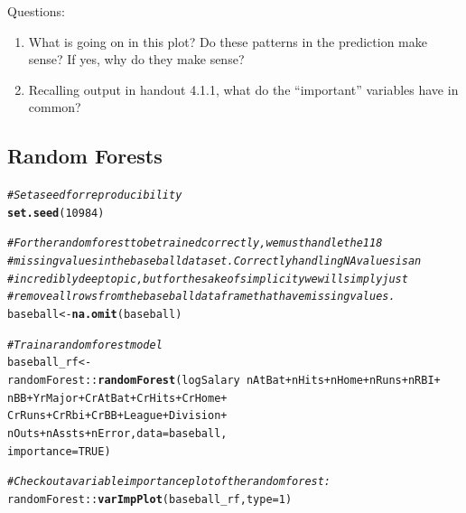\documentclass{article}\usepackage[]{graphicx}\usepackage[]{color}
\makeatletter
\newcommand{\hlnum}[1]{\textcolor[rgb]{0.686,0.059,0.569}{#1}}%
\newcommand{\hlcom}[1]{\textcolor[rgb]{0.678,0.584,0.686}{\textit{#1}}}%
\newcommand{\hlopt}[1]{\textcolor[rgb]{0,0,0}{#1}}%
\newcommand{\hlstd}[1]{\textcolor[rgb]{0.345,0.345,0.345}{#1}}%
\newcommand{\hlkwb}[1]{\textcolor[rgb]{0.69,0.353,0.396}{#1}}%
\newcommand{\hlkwc}[1]{\textcolor[rgb]{0.333,0.667,0.333}{#1}}%
\newcommand{\hlkwd}[1]{\textcolor[rgb]{0.737,0.353,0.396}{\textbf{#1}}}%
\newenvironment{kframe}{%
 \def\at@end@of@kframe{}%
 \ifinner\ifhmode%
  \def\at@end@of@kframe{\end{minipage}}%
  \begin{minipage}{\columnwidth}%
 \fi\fi%
 \def\FrameCommand##1{\hskip\@totalleftmargin \hskip-\fboxsep
 \colorbox{shadecolor}{##1}\hskip-\fboxsep
     \hskip-\linewidth \hskip-\@totalleftmargin \hskip\columnwidth}%
 \MakeFramed {\advance\hsize-\width
   \@totalleftmargin\z@ \linewidth\hsize
   \@setminipage}}%
 {\par\unskip\endMakeFramed%
 \at@end@of@kframe}
\newenvironment{knitrout}{}{} %
\makeatother
\begin{document}
Questions:
\begin{enumerate}
  \item What is going on in this plot? Do these patterns in the prediction make sense? If yes, why do they make sense?
  \item Recalling output in handout 4.1.1, what do the ``important'' variables have in common?
\end{enumerate}

\newpage

\subsection*{Random Forests}

\begin{knitrout}
\color{fgcolor}\begin{kframe}
\begin{alltt}
\hlcom{# Set a seed for reproducibility}
\hlkwd{set.seed}\hlstd{(}\hlnum{10984}\hlstd{)}

\hlcom{# For the random forest to be trained correctly, we must handle the 118}
\hlcom{# missing values in the baseball dataset. Correctly handling NA values is an}
\hlcom{# incredibly deep topic, but for the sake of simplicity we will simply just}
\hlcom{# remove all rows from the baseball dataframe that have missing values.}
\hlstd{baseball} \hlkwb{<-} \hlkwd{na.omit}\hlstd{(baseball)}

\hlcom{# Train a random forest model}
\hlstd{baseball_rf} \hlkwb{<-}
  \hlstd{randomForest}\hlopt{::}\hlkwd{randomForest}\hlstd{(logSalary} \hlopt{~} \hlstd{nAtBat} \hlopt{+} \hlstd{nHits} \hlopt{+} \hlstd{nHome} \hlopt{+} \hlstd{nRuns} \hlopt{+} \hlstd{nRBI} \hlopt{+}
                               \hlstd{nBB} \hlopt{+} \hlstd{YrMajor} \hlopt{+} \hlstd{CrAtBat} \hlopt{+} \hlstd{CrHits} \hlopt{+} \hlstd{CrHome} \hlopt{+}
                               \hlstd{CrRuns} \hlopt{+} \hlstd{CrRbi} \hlopt{+} \hlstd{CrBB} \hlopt{+} \hlstd{League} \hlopt{+} \hlstd{Division} \hlopt{+}
                               \hlstd{nOuts} \hlopt{+} \hlstd{nAssts} \hlopt{+} \hlstd{nError,} \hlkwc{data} \hlstd{= baseball,}
                             \hlkwc{importance}\hlstd{=}\hlnum{TRUE}\hlstd{)}

\hlcom{# Check out a variable importance plot of the random forest:}
\hlstd{randomForest}\hlopt{::}\hlkwd{varImpPlot}\hlstd{(baseball_rf,} \hlkwc{type} \hlstd{=} \hlnum{1}\hlstd{)}
\end{alltt}
\end{kframe}


\end{knitrout}
\end{document}
